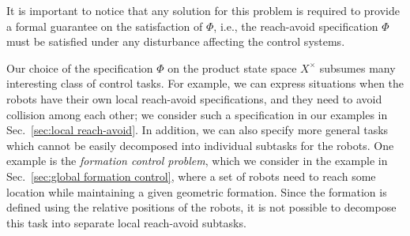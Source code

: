 \begin{comment}
\begin{description}
	\item[Inputs:] Control systems $\Sigma^i=(X^i,x_\init^i,U^i,W^i,f^i)$, $i\in [1;N]$, and the global specification $\Phi=\lnot\avoid\,\mathcal{U}\,\goal$.%
	\item[Parameters:] A robustness margin $\varepsilon\in \reals^n_{>0}$.%
	\item[Output:] Local feedback controllers $\set{C^i}$ for $\set{\Sigma^i}$, $i\in [1;N]$, such that $\set{C^i}\parallel \set{\Sigma^i}$ realizes $\Phi$. 
\end{description}
\end{comment}

It is important to notice that any solution for this problem is required to provide a formal guarantee on the satisfaction of $\Phi$, i.e., the reach-avoid specification $\Phi$ must be satisfied under any disturbance affecting the control systems.

Our choice of the specification $\Phi$ on the product state space $X^\times$ subsumes many interesting class of control tasks.
For example, we can express situations when the robots have their own local reach-avoid specifications, and they need to avoid collision among each other; we consider such a specification in our examples in Sec.~\ref{sec:local reach-avoid}.
In addition, we can also specify more general tasks which cannot be easily decomposed into individual subtasks for the robots.
One example is the \emph{formation control problem}, which we consider in the example in Sec.~\ref{sec:global formation control}, where a set of robots need to reach some location while maintaining a given geometric formation. Since the formation is defined using the relative positions of the robots, it is not possible to decompose this task into separate local reach-avoid subtasks.

